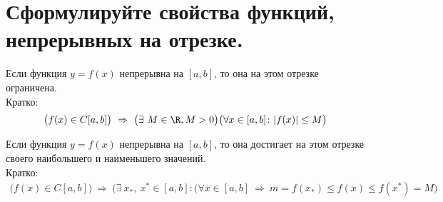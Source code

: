 \section{Сформулируйте свойства функций, непрерывных на отрезке.}

\begin{theorem}
  Если функция $y=f(x)$ непрерывна на $[a, b]$, то она на этом отрезке ограничена.\\
  Кратко: \vspace{-\topsep}
  \begin{gather*}
    \big(f(x) \in C[a, b]\big)\ \Rightarrow\ \big(\exists\ M \in \R, M>0\big) \big(\forall x \in [a, b]\colon |f(x)| \le M\big)
  \end{gather*}
\end{theorem}
\begin{theorem}
  Если функция $y = f(x)$ непрерывна на $[a, b]$, то она достигает на этом отрезке своего наибольшего и наименьшего значений.\\
  Кратко:\vspace{-\topsep}
  \begin{gather*}
    \big(f(x) \in C[a, b]\big)\ \Rightarrow\ \big(\exists\ x_{*},\ x^{*} \in [a, b]\colon (\forall x \in [a, b]\ \Rightarrow\ m = f(x_{*}) \le f(x) \le f(x^{*}) = M\big)
  \end{gather*}
\end{theorem} \vspace{-\topsep}
